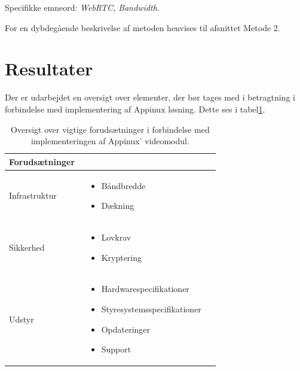 Specifikke emneord: \textit{WebRTC, Bandwidth.}

For en dybdegående beskrivelse af metoden henvises til afsnittet Metode 2. 



\section{Resultater}
Der er udarbejdet en oversigt over elementer, der bør tages med i betragtning i forbindelse med implementering af Appinux løsning. Dette ses i tabel\ref{tab:tabelforud}.
\begin{table}[H]
\caption{Oversigt over vigtige forudsætninger i forbindelse med implementeringen af Appinux' videomodul.}
\centering
\label{tab:tabelforud}
\begin{tabular}{|p{0.2\linewidth}m{0.5\linewidth}|}
\hline
\textbf{Forudsætninger} & \\ \hline
Infrastruktur & \begin{itemize}\item Båndbredde\item Dækning \end{itemize}\\ \hline
Sikkerhed & \begin{itemize}\item Lovkrav\item Kryptering \end{itemize}\\ \hline
Udstyr & \begin{itemize}\item Hardwarespecifikationer \item Styresystemsspecifikationer \item Opdateringer \item Support \end{itemize}\\ \hline
\end{tabular}

\end{table}
